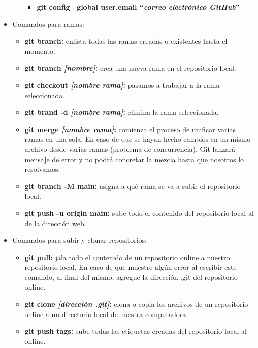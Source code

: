 \begin{itemize}
\begin{itemize}
\begin{itemize}
            \item \textbf{git config –global user.email “\textit{correo electrónico GitHub}”}
        \end{itemize}
    \end{itemize}
    \item Comandos para ramas:
    \begin{itemize}
        \item \textbf{git branch:} enlista todas las ramas creadas o existentes hasta el momento.
        \item \textbf{git branch \textit{[nombre]}:} crea una nueva rama en el repositorio local.
        \item \textbf{git checkout \textit{[nombre rama]}:} pasamos a trabajar a la rama seleccionada.
        \item \textbf{git brand -d \textit{[nombre rama]}:} elimina la rama seleccionada.
        \item \textbf{git merge \textit{[nombre rama]}:} comienza el proceso de unificar varias ramas en una sola. En caso de que se hayan hecho cambios en un mismo archivo desde varias ramas (problema de concurrencia), Git lanzará mensaje de error y no podrá concretar la mezcla hasta que nosotros lo resolvamos.
        \item \textbf{git branch -M main: }asigna a qué rama se va a subir el repositorio local.
        \item \textbf{git push -u origin main:} sube todo el contenido del repositorio local al de la dirección web.
    \end{itemize}
    \item Comandos para subir y clonar repositorios:
    \begin{itemize}
        \item \textbf{git pull: }jala todo el contenido de un repositorio online a nuestro repositorio local. En caso de que muestre algún error al escribir este comando, al final del mismo, agregue la dirección .git del repositorio online.
        \item \textbf{git clone \textit{[dirección .git]}:} clona o copia los archivos de un repositorio online a un directorio local de nuestra computadora.
        \item \textbf{git push tags: }sube todas las etiquetas creadas del repositorio local al online.
    \end{itemize}
\end{itemize}



